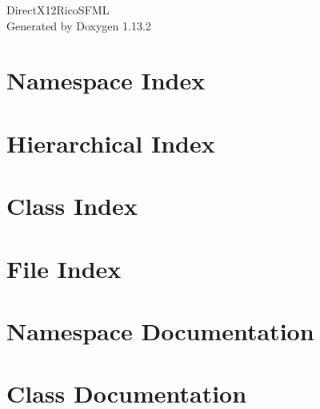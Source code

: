 \documentclass[twoside]{book}
\newcommand{\+}{\discretionary{\mbox{\scriptsize$\hookleftarrow$}}{}{}}
\newcommand{\clearemptydoublepage}{%
    \newpage{\pagestyle{empty}\cleardoublepage}%
  }
\begin{document}
  \raggedbottom
    \hypersetup{pageanchor=false,
                bookmarksnumbered=true,
                pdfencoding=unicode
               }
  \begin{titlepage}
  \vspace*{7cm}
  \begin{center}%
  {\Large Direct\+X12\+Rico\+SFML}\\
  \vspace*{1cm}
  {\large Generated by Doxygen 1.13.2}\\
  \end{center}
  \end{titlepage}
  \clearemptydoublepage
  \tableofcontents
  \clearemptydoublepage
  \hypersetup{pageanchor=true}

\chapter{Namespace Index}

\chapter{Hierarchical Index}

\chapter{Class Index}

\chapter{File Index}

\chapter{Namespace Documentation}


\chapter{Class Documentation}







\end{document}
